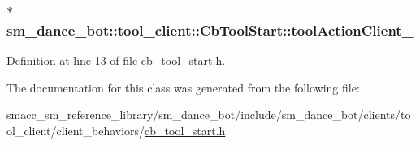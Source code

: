 \subsubsection[{\texorpdfstring{tool\+Action\+Client\+\_\+}{toolActionClient_}}]{$\ast$ sm\+\_\+dance\+\_\+bot\+::tool\+\_\+client\+::\+Cb\+Tool\+Start\+::tool\+Action\+Client\+\_\+}\hypertarget{classsm__dance__bot_1_1tool__client_1_1CbToolStart_af25839ca32b7478b30f3c42356a417bf}{}\label{classsm__dance__bot_1_1tool__client_1_1CbToolStart_af25839ca32b7478b30f3c42356a417bf}


Definition at line 13 of file cb\+\_\+tool\+\_\+start.\+h.



The documentation for this class was generated from the following file\+:\begin{DoxyCompactItemize}
\item 
smacc\+\_\+sm\+\_\+reference\+\_\+library/sm\+\_\+dance\+\_\+bot/include/sm\+\_\+dance\+\_\+bot/clients/tool\+\_\+client/client\+\_\+behaviors/\hyperlink{cb__tool__start_8h}{cb\+\_\+tool\+\_\+start.\+h}\end{DoxyCompactItemize}
